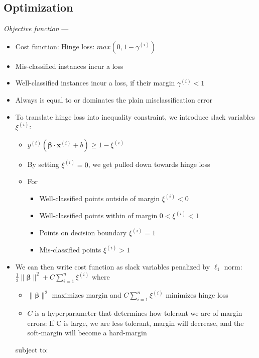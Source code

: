 \subsection*{Optimization}
\emph{Objective function} --- 
\begin{itemize}
    \item Cost function: Hinge loss: $max(0,1-\gamma^{(i)})$
    \item Mis-classified instances incur a loss
    \item Well-classified instances incur a loss, if their margin $\gamma^{(i)} < 1$
    \item Always is equal to or dominates the plain misclassification error
    \item To translate hinge loss into inequality constraint, we introduce slack variables $\xi^{(i)}$:
    \begin{itemize}
        \item $y^{(i)} (\boldsymbol{\beta} \cdot \boldsymbol{x}^{(i)} + b) \geq 1 - \xi^{(i)}$
        \item By setting $\xi^{(i)} = 0$, we get pulled down towards hinge loss
        \item For
        \begin{itemize}
            \item Well-classified points outside of margin $\xi^{(i)} < 0$
            \item Well-classified points within of margin $0 < \xi^{(i)} < 1$
            \item Points on decision boundary $\xi^{(i)} = 1$
            \item Mis-classified points $\xi^{(i)} > 1$
        \end{itemize}
    \end{itemize}
    \item We can then write cost function as slack variables penalized by $\ell_1$ norm: $\frac{1}{2} \| \boldsymbol{\beta} \|^2 + C \sum_{i=1}^n \xi^{(i)}$ where 
    \begin{itemize}
        \item $\| \boldsymbol{\beta} \|^2$ maximizes margin and $C \sum_{i=1}^n \xi^{(i)}$ minimizes hinge loss
        \item $C$ is a hyperparameter that determines how tolerant we are of margin errors: If C is large, we are less tolerant, margin will decrease, and the soft-margin will become a hard-margin
    \end{itemize}
    subject to:
    \begin{itemize}

\end{itemize}
\end{itemize}
